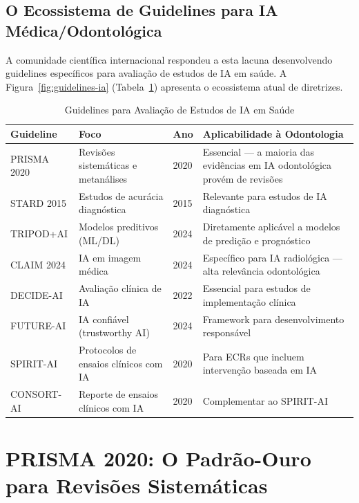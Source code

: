 \subsection{O Ecossistema de Guidelines para IA Médica/Odontológica}

A comunidade científica internacional respondeu a esta lacuna desenvolvendo guidelines específicos para avaliação de estudos de IA em saúde. A Figura~\ref{fig:guidelines-ia} (Tabela~\ref{tab:guidelines-ia}) apresenta o ecossistema atual de diretrizes.

\begin{table}[H]
  \centering
  \caption{Guidelines para Avaliação de Estudos de IA em Saúde}
  \label{tab:guidelines-ia}
  \begin{tabularx}{\textwidth}{p{2.5cm}Xp{2cm}p{2cm}}
    \toprule
    \textbf{Guideline} & \textbf{Foco} & \textbf{Ano} & \textbf{Aplicabilidade à Odontologia} \\
    \midrule
    PRISMA 2020 & Revisões sistemáticas e metanálises & 2020 & Essencial — a maioria das evidências em IA odontológica provém de revisões \\
    STARD 2015 & Estudos de acurácia diagnóstica & 2015 & Relevante para estudos de IA diagnóstica \\
    TRIPOD+AI & Modelos preditivos (ML/DL) & 2024 & Diretamente aplicável a modelos de predição e prognóstico \\
    CLAIM 2024 & IA em imagem médica & 2024 & Específico para IA radiológica — alta relevância odontológica \\
    DECIDE-AI & Avaliação clínica de IA & 2022 & Essencial para estudos de implementação clínica \\
    FUTURE-AI & IA confiável (trustworthy AI) & 2024 & Framework para desenvolvimento responsável \\
    SPIRIT-AI & Protocolos de ensaios clínicos com IA & 2020 & Para ECRs que incluem intervenção baseada em IA \\
    CONSORT-AI & Reporte de ensaios clínicos com IA & 2020 & Complementar ao SPIRIT-AI \\
    \bottomrule
  \end{tabularx}
\end{table}

\section{PRISMA 2020: O Padrão-Ouro para Revisões Sistemáticas}

